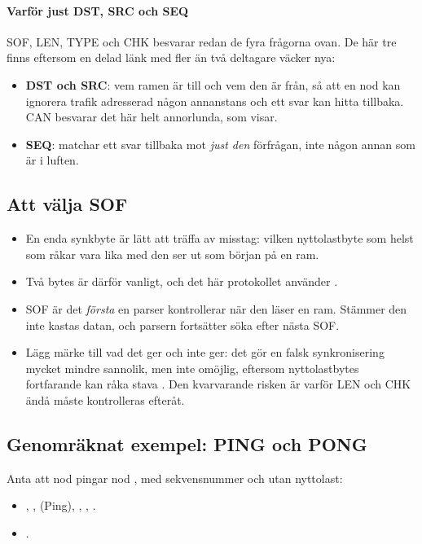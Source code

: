 \paragraph{Varför just DST, SRC och SEQ}
SOF, LEN, TYPE och CHK besvarar redan de fyra frågorna ovan. De här tre finns eftersom en delad länk
med fler än två deltagare väcker nya:
\begin{itemize}
  \item \textbf{DST och SRC}: vem ramen är till och vem den är från, så att en nod kan ignorera
    trafik adresserad någon annanstans och ett svar kan hitta tillbaka. CAN besvarar det här helt
    annorlunda, som  visar.
  \item \textbf{SEQ}: matchar ett svar tillbaka mot \emph{just den} förfrågan, inte någon annan som
    är i luften.
\end{itemize}

\subsection*{Att välja SOF}
\begin{itemize}
  \item En enda synkbyte är lätt att träffa av misstag: vilken nyttolastbyte som helst som råkar
    vara lika med den ser ut som början på en ram.
  \item Två bytes är därför vanligt, och det här protokollet använder .
  \item SOF är det \emph{första} en parser kontrollerar när den läser en ram. Stämmer den inte
    kastas datan, och parsern fortsätter söka efter nästa SOF.
  \item Lägg märke till vad det ger och inte ger: det gör en falsk synkronisering mycket mindre
    sannolik, men inte omöjlig, eftersom nyttolastbytes fortfarande kan råka stava . Den
    kvarvarande risken är varför LEN och CHK ändå måste kontrolleras efteråt.
\end{itemize}

\subsection*{Genomräknat exempel: PING och PONG}
Anta att nod  pingar nod , med sekvensnummer  och utan nyttolast:
\begin{itemize}
  \item {}, ,  (Ping), ,
    , .
  \item {}.
\end{itemize}

